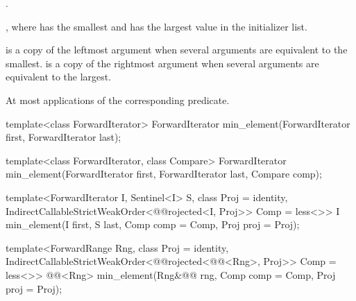 \begin{itemdescr}
\pnum
\requires {}.

\pnum
\returns {}, where  has the smallest and  has the
largest value in the initializer list.

\pnum
\remarks {} is a copy of the leftmost argument when several arguments are equivalent to
the smallest.  is a copy of the rightmost argument when several arguments are
equivalent to the largest.

\pnum
\complexity At most 
applications of the corresponding predicate.
\end{itemdescr}

%
\begin{removedblock}
\begin{itemdecl}
template<class ForwardIterator>
  ForwardIterator min_element(ForwardIterator first, ForwardIterator last);

template<class ForwardIterator, class Compare>
  ForwardIterator min_element(ForwardIterator first, ForwardIterator last,
                            Compare comp);
\end{itemdecl}
\end{removedblock}
\begin{addedblock}
\begin{itemdecl}
template<ForwardIterator I, Sentinel<I> S, class Proj = identity,
    IndirectCallableStrictWeakOrder<@@rojected<I, Proj>> Comp = less<>>
  I min_element(I first, S last, Comp comp = Comp{}, Proj proj = Proj{});

template<ForwardRange Rng, class Proj = identity,
    IndirectCallableStrictWeakOrder<@@rojected<@@<Rng>, Proj>> Comp = less<>>
  @@<Rng>
    min_element(Rng&@\newtxt{\&}@ rng, Comp comp = Comp{}, Proj proj = Proj{});
\end{itemdecl}
\end{addedblock}

